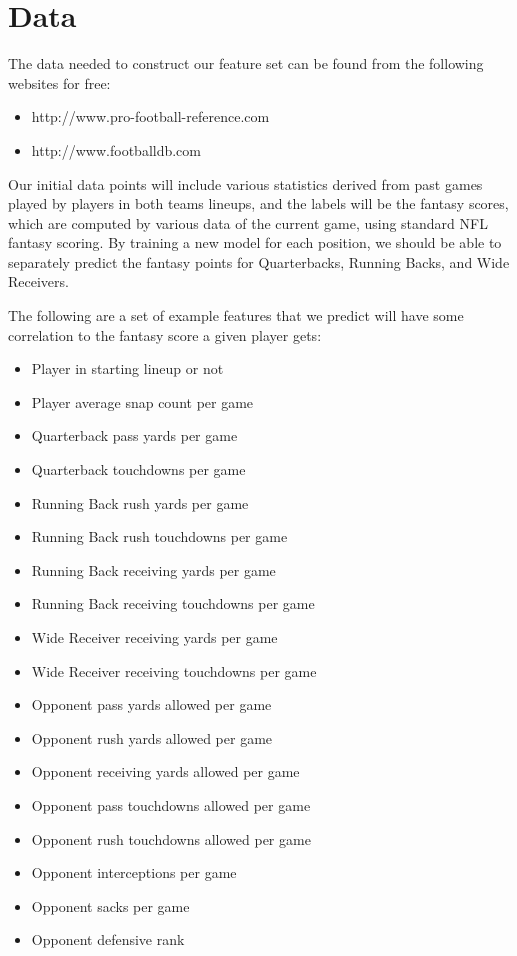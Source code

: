 \documentclass[11pt,a4paper]{article}
\begin{document}
\section{Data}
The data needed to construct our feature set can be found from the following websites for free:
\begin{itemize}
\item
http://www.pro-football-reference.com
\item
http://www.footballdb.com
\end{itemize}

Our initial data points will include various statistics derived from past games played by players in both teams lineups, and the labels will be the fantasy scores, which are computed by various data of the current game, using standard NFL fantasy scoring. By training a new model for each position, we should be able to separately predict the fantasy points for Quarterbacks, Running Backs, and Wide Receivers.

The following are a set of example features that we predict will have some correlation to the fantasy score a given player gets:
\begin{itemize}
\item
Player in starting lineup or not
\item
Player average snap count per game
\item
Quarterback pass yards per game
\item
Quarterback touchdowns per game
\item
Running Back rush yards per game
\item
Running Back rush touchdowns per game
\item
Running Back receiving yards per game
\item
Running Back receiving touchdowns per game
\item
Wide Receiver receiving yards per game
\item
Wide Receiver receiving touchdowns per game
\item
Opponent pass yards allowed per game
\item
Opponent rush yards allowed per game
\item
Opponent receiving yards allowed per game
\item
Opponent pass touchdowns allowed per game
\item
Opponent rush touchdowns allowed per game
\item
Opponent interceptions per game
\item
Opponent sacks per game
\item
Opponent defensive rank
\end{itemize}
\end{document}
